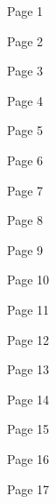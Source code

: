 \documentclass[a4paper]{article}
\begin{document}
\Huge

Page 1

\pagebreak

Page 2

\pagebreak

Page 3

\pagebreak

Page 4

\pagebreak

Page 5

\pagebreak

Page 6

\pagebreak

Page 7

\pagebreak

Page 8

\pagebreak

Page 9

\pagebreak

Page 10

\pagebreak

Page 11

\pagebreak

Page 12

\pagebreak

Page 13

\pagebreak

Page 14

\pagebreak

Page 15

\pagebreak

Page 16

\pagebreak

Page 17

\pagebreak
\end{document}
